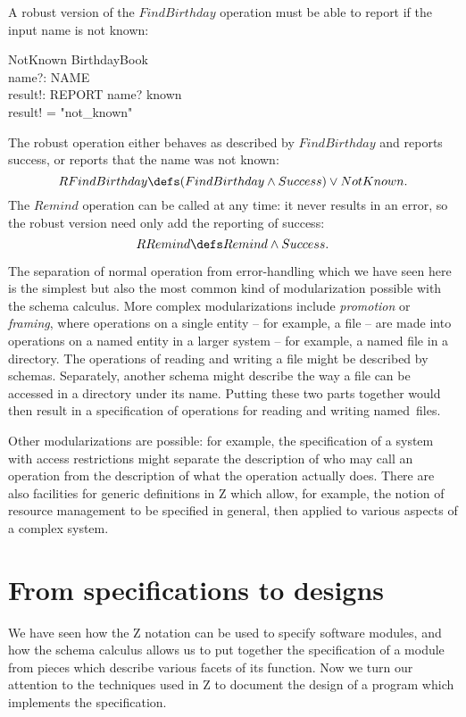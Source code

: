 A robust version of the $FindBirthday$ operation must be able to report
if the input name is not known:
\begin{schema}{NotKnown}
	\Xi BirthdayBook \\
	name?: NAME \\
	result!: REPORT
\where
	name? \notin known \\
	result! = "not\_known"
\end{schema}
The robust operation either behaves as described by $FindBirthday$ and
reports success, or reports that the name was not known:
\[ RFindBirthday \defs (FindBirthday \land Success) \lor NotKnown. \]
The $Remind$ operation can be called at any time: it never results in
an error, so the robust version need only add the reporting of success:
\[ RRemind \defs Remind \land Success. \]

The separation of normal operation from error-handling which we
have seen here is the simplest but also the most common kind of
modularization possible with the schema calculus.
More complex modularizations include {\em promotion} or
{\em framing}, where operations
on a single entity -- for example, a file -- are made into
operations on a named entity in a larger system -- for example, a
named file in a directory.
The operations of reading and writing a file might be described by
schemas. Separately, another schema might describe the way a file can
be accessed in a directory under its name. Putting these two parts
together would then result in a specification of operations for
reading and writing named~files.

Other modularizations are possible: for example, the
specification of a system with access restrictions might separate the
description of who may call an operation from the description of what
the operation actually does.
There are also facilities for generic definitions in Z which allow, for
example, the notion of resource management to be specified in general,
then applied to various aspects of a complex system.

\section{From specifications to designs}

We have seen how the Z notation can be used to specify software modules,
and how the schema calculus allows us to put together the specification
of a module from pieces which describe various facets of its function.
Now we turn our attention to the techniques used in Z to document the design
of a program which implements the specification.

